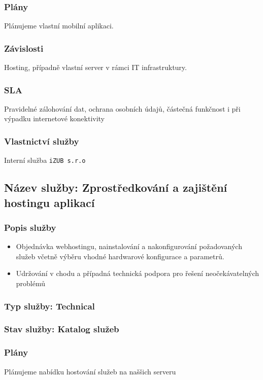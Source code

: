 \documentclass[11pt, a4paper, titlepage]{article}
\begin{document}
	\subsubsection*{Plány}
	Plánujeme vlastní mobilní aplikaci.

	\subsubsection*{Závislosti}
	Hosting, případně vlastní server v rámci IT infrastruktury.

	\subsubsection*{SLA}
	Pravidelné zálohování dat, ochrana osobních údajů, částečná funkčnost i při výpadku internetové konektivity

	\subsubsection*{Vlastnictví služby}
	Interní služba \texttt{iZUB s.r.o}

	\subsection*{Název služby: Zprostředkování a zajištění hostingu aplikací}	

	\subsubsection*{Popis služby}
	\begin{itemize}
		\item Objednávka webhostingu, nainstalování a nakonfigurování požadovaných služeb včetně výběru vhodné hardwarové konfigurace a parametrů.
		\item Udržování v chodu a případná technická podpora pro řešení neočekávatelných problémů
	\end{itemize}

	\subsubsection*{Typ služby: Technical}

	\subsubsection*{Stav služby: Katalog služeb}

	\subsubsection*{Plány}
	Plánujeme nabídku hostování služeb na naššich serveru
\end{document}
